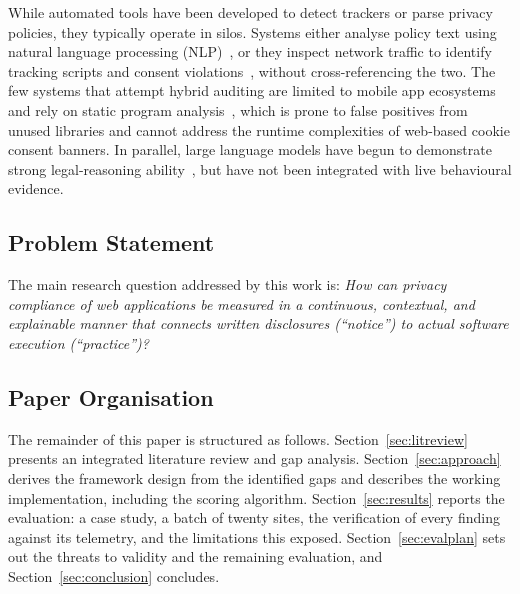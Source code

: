 \documentclass[conference]{IEEEtran}
\begin{document}
While automated tools have been developed to detect trackers or parse privacy policies, they typically operate in silos. Systems either analyse policy text using natural language processing (NLP)~\cite{wilson-2016-opp115,harkous-2018-polisis,ravichander-2019-privacyqa}, or they inspect network traffic to identify tracking scripts and consent violations~\cite{trevisan-2019-cookielaw,bouhoula-2024-cookies}, without cross-referencing the two. The few systems that attempt hybrid auditing are limited to mobile app ecosystems and rely on static program analysis~\cite{zimmeck-2017-mobileapps,zimmeck-2019-maps,xiao-2023-lalaine}, which is prone to false positives from unused libraries and cannot address the runtime complexities of web-based cookie consent banners. In parallel, large language models have begun to demonstrate strong legal-reasoning ability~\cite{guha-2023-legalbench,xie-2025-llmpolicy}, but have not been integrated with live behavioural evidence.

\subsection{Problem Statement}
The main research question addressed by this work is: \textit{How can privacy compliance of web applications be measured in a continuous, contextual, and explainable manner that connects written disclosures (``notice'') to actual software execution (``practice'')?}

\subsection{Paper Organisation}
The remainder of this paper is structured as follows. Section~\ref{sec:litreview} presents an integrated literature review and gap analysis. Section~\ref{sec:approach} derives the framework design from the identified gaps and describes the working implementation, including the scoring algorithm. Section~\ref{sec:results} reports the evaluation: a case study, a batch of twenty sites, the verification of every finding against its telemetry, and the limitations this exposed. Section~\ref{sec:evalplan} sets out the threats to validity and the remaining evaluation, and Section~\ref{sec:conclusion} concludes.

\end{document}
